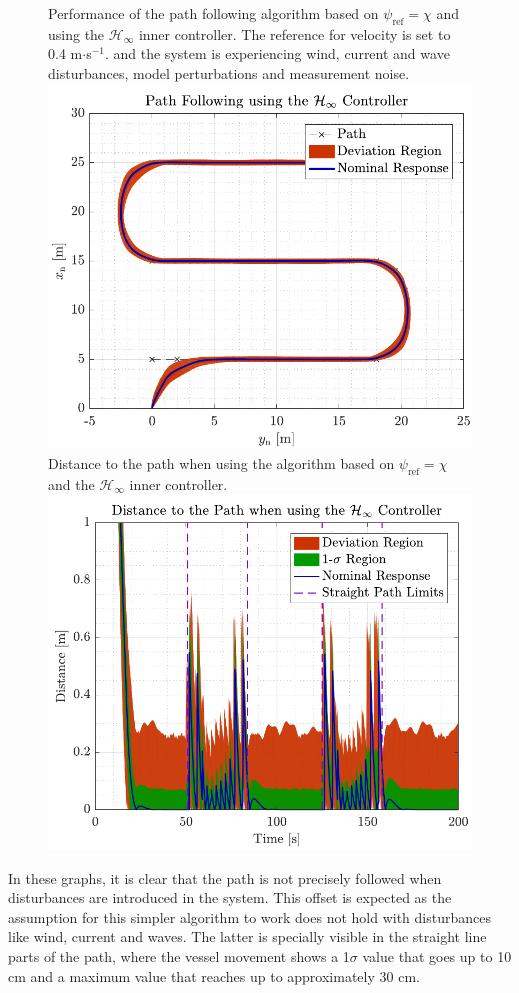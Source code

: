 \begin{figure}[H]
	\captionbox 
	{   
		Performance of the path following algorithm based on $\psi_\mathrm{ref}=\chi$ and using the $\mathcal{H}_\infty$ inner controller. The reference for velocity is set to \num{0.4} m$\cdot$s$^{-1}$. and the system is experiencing wind, current and wave disturbances, model perturbations and measurement noise. \label{fig:robwrong}      
	}                                                                 
	{                                                                  
		\includegraphics[width=.45\textwidth]{figures/path_rob_no_correc}         
	}                                                                    
	\hspace{5pt}                                                          
	\captionbox  
	{      
		Distance to the path when using the algorithm based on $\psi_\mathrm{ref}=\chi$ and the $\mathcal{H}_\infty$ inner controller.\label{fig:distrobwrong}
	}                                                                          
	{
		\includegraphics[width=.45\textwidth]{figures/dist_rob_no_correc}
	}
\end{figure}

In these graphs, it is clear that the path is not precisely followed when disturbances are introduced in the system. This offset is expected as the assumption for this simpler algorithm to work does not hold with disturbances like wind, current and waves. The latter is specially visible in the straight line parts of the path, where the vessel movement shows a 1$\sigma$ value that goes up to 10 cm and a maximum value that reaches up to approximately 30 cm.

